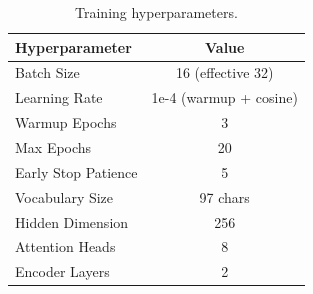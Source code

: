 \begin{table}[t]
\centering
\begin{tabular}{lc}
\hline
\textbf{Hyperparameter} & \textbf{Value} \\
\hline
Batch Size & 16 (effective 32) \\
Learning Rate & 1e-4 (warmup + cosine) \\
Warmup Epochs & 3 \\
Max Epochs & 20 \\
Early Stop Patience & 5 \\
Vocabulary Size & 97 chars \\
Hidden Dimension & 256 \\
Attention Heads & 8 \\
Encoder Layers & 2 \\
\hline
\end{tabular}
\caption{Training hyperparameters.}
\label{tab:hyperparams}
\end{table}
